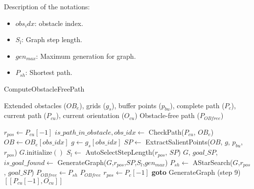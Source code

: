 Description of the notations:
\begin{multicols}{2}
\begin{itemize}[noitemsep,topsep=0pt]
    \item $obs_idx$: obstacle index.
    \item $S_l$: Graph step length.
    \item $gen_{max}$: Maximum generation for graph.
    \item $P_{sh}$: Shortest path.
\end{itemize}
\end{multicols}

\begin{algorithm}[H]
    \caption{ComputeObstacleFreePath}
    \label{alg:compute_obstacle_free_path}
    \begin{algorithmic}[1]
    \Require Extended obstacles ($OB_e$), grids ($g_s$), buffer points ($p_{bu}$), complete path ($P_c$), current path ($P_{cu}$), current orientation ($O_{cu}$)
    \Ensure Obstacle-free path ($P_{OB free}$)

    \State $r_{pos} \leftarrow P_{cu}[-1]$
    \State $is\_path\_in\_obstacle, obs\_idx \leftarrow$ CheckPath($P_{cu}$, $OB_e$)
        \State $OB\leftarrow OB_e[obs\_idx]$
        \State $g \leftarrow g_s[obs\_idx]$
        \State $SP \leftarrow$ ExtractSalientPoints($OB$, $g$, $p_{bu}$, $r_{pos}$)
        \State $G.\text{initialize}()$
        \State $S_l \leftarrow$ AutoSelectStepLength($r_{pos}$, $SP$)
        \State $G$, $goal\_SP$, $is\_goal\_found \leftarrow$ GenerateGraph($G$,$r_{pos}$,$SP$,$S_l$,$gen_{max}$)
            \State $P_{sh} \leftarrow$ AStarSearch($G$,$r_{pos}$, $goal\_SP$)
            \State $P_{OB free} \leftarrow P_{sh}$
            \State \Return $P_{OB free}$
        \Else
            \State $r_{pos} \leftarrow P_c[-1]$ 
            \State \textbf{goto} GenerateGraph (step 9)
        \EndIf
    \Else
        \State \Return $[[P_{cu}[-1], O_{cu}]]$
    \EndIf
    \end{algorithmic}
    \end{algorithm}






